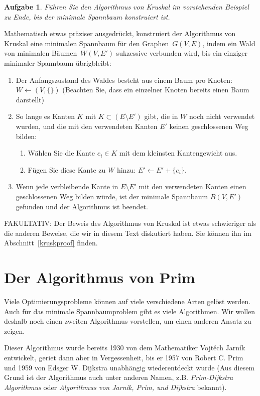 \documentclass[12pt,a4paper]{report}
\theoremstyle{break}
\newtheorem{exercise}{Aufgabe}[chapter]
\theoremstyle{plain}
\begin{document}
\newpage
\begin{exercise}\label{exkruskal}
F\"{u}hren Sie den Algorithmus von Kruskal im vorstehenden Beispiel zu
Ende, bis der minimale Spannbaum konstruiert ist.
\end{exercise}

Mathematisch etwas pr\"{a}ziser ausgedr\"{u}ckt, konstruiert der
Algorithmus von Kruskal eine minimalen Spannbaum f\"{u}r den 
Graphen~$G(V,E)$, indem ein Wald von minimalen B\"{a}umen~$W(V, E')$
sukzessive verbunden wird, bis ein einziger minimaler Spannbaum
\"ubrigbleibt:

\begin{enumerate}
\item Der Anfangszustand des Waldes besteht aus einem Baum pro Knoten:
  $W \gets (V, \{\})$ (Beachten Sie, dass ein
  einzelner Knoten bereits einen Baum darstellt)
\item So lange es Kanten $K$ mit $K\subset (E\setminus{E'})$ gibt, die in $W$ noch nicht
  verwendet wurden, und die mit den verwendeten Kanten $E'$ keinen
  geschlossenen Weg bilden:
\begin{enumerate}
\item W\"{a}hlen Sie die Kante $e_i\in K$ mit dem kleinsten
  Kantengewicht aus.
\item F\"{u}gen Sie diese Kante zu $W$ hinzu: $E' \gets E'+\{e_i\}$.
\end{enumerate}
\item Wenn jede verbleibende Kante in $E\setminus{E'}$ mit den
  verwendeten Kanten einen geschlossenen Weg bilden w\"{u}rde, ist der
  minimale Spannbaum $B(V,E')$ gefunden und der Algorithmus ist beendet.
\end{enumerate}

FAKULTATIV: Der Beweis des Algorithmus von Kruskal ist etwas
schwieriger als die anderen Beweise, die wir in diesem Text diskutiert
haben. Sie k\"{o}nnen ihn im Abschnitt~\ref{kruskproof} finden.

\newpage
\section{Der Algorithmus von Prim}

Viele Optimierungsprobleme k\"{o}nnen auf viele verschiedene Arten
gel\"{o}st werden. Auch f\"{u}r das minimale Spannbaumproblem gibt es
viele Algorithmen. Wir wollen deshalb noch einen zweiten
Algorithmus vorstellen, um einen anderen Ansatz zu zeigen.

Dieser Algorithmus wurde bereits 1930 von dem Mathematiker
Vojt\v{e}ch Jarn\'ik entwickelt, geriet dann aber in Vergessenheit,
bis er 1957 von Robert C. Prim und 1959 von Edsger W. Dijkstra
unabh\"{a}ngig wiederentdeckt wurde (Aus diesem Grund ist der
Algorithmus auch unter anderen Namen, z.B. \emph{Prim-Dijkstra
  Algorithmus} oder \emph{Algorithmus von Jarnik, Prim, und Dijkstra}
bekannt).
\end{document}
